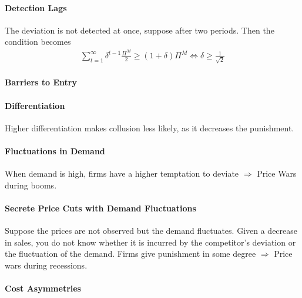 \documentclass[11pt]{elegantbook}
\begin{document}
\paragraph*{Detection Lags}
The deviation is not detected at once, suppose after two periods. Then the condition becomes
\begin{equation}
    \begin{aligned}
        \sum_{t=1}^\infty\delta^{t-1}\frac{\Pi^M}{2}\geq (1+\delta)\Pi^M
        \Leftrightarrow \delta\geq \frac{1}{\sqrt{2}}
    \end{aligned}
    \nonumber
\end{equation}

\paragraph*{Barriers to Entry}

\paragraph*{Differentiation} Higher differentiation makes collusion less likely, as it decreases the punishment.

\paragraph*{Fluctuations in Demand}
When demand is high, firms have a higher temptation to deviate $\Rightarrow$ Price Wars during booms.

\paragraph*{Secrete Price Cuts with Demand Fluctuations} Suppose the prices are not observed but the demand fluctuates. Given a decrease in sales, you do not know whether it is incurred by the competitor's deviation or the fluctuation of the demand. Firms give punishment in some degree $\Rightarrow$ Price wars during recessions.

\paragraph*{Cost Asymmetries}
\end{document}
